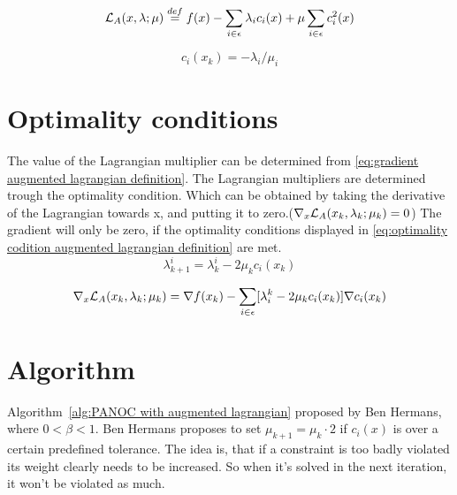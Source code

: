 	\begin{equation}
		\mathcal{L}_A(x,\lambda;\mu) \overset{def}{=} f(x) - \sum_{i \in \epsilon}\lambda_ic_i(x) + \mu \sum_{i \in \epsilon}c_i^2(x)
		\label{eq:augmented lagrangian definition}
	\end{equation}
			
	\begin{equation}
		c_i(x_k) = -\lambda_i/\mu_i
		\label{eq:perturbed feasibility conditions}
	\end{equation}
	

\section{Optimality conditions}
	The value of the Lagrangian multiplier can be determined from \eqref{eq:gradient augmented lagrangian definition}. The Lagrangian multipliers are determined trough the optimality condition. Which can be obtained by taking the derivative of the Lagrangian towards x, and putting it to zero.($\nabla_x \mathcal{L}_A(x_k,\lambda_k;\mu_k) = 0$) The gradient will only be zero, if the optimality conditions displayed in \eqref{eq:optimality codition augmented lagrangian definition} are met.
	\begin{equation}
		\lambda_{k+1}^{i} = \lambda_{k}^{i} - 2\mu_k c_i(x_k)
		\label{eq:optimality codition augmented lagrangian definition}
	\end{equation}

	\begin{equation}
		\nabla_x \mathcal{L}_A(x_k,\lambda_k;\mu_k) = \nabla f(x_k) - \sum_{i \in \epsilon} [\lambda_i^k - 2\mu_k c_i(x_k)] \nabla c_i(x_k)
		\label{eq:gradient augmented lagrangian definition}
	\end{equation}	
	
	
	
\section{Algorithm}
	Algorithm~\ref{alg:PANOC with augmented lagrangian} proposed by Ben Hermans, where $0<\beta<1$. Ben Hermans proposes to set $\mu_{k+1}=\mu_k \cdot 2$ if $c_i(x)$ is over a certain predefined tolerance. The idea is, that if a constraint is too badly violated its weight clearly needs to be increased. So when it's solved in the next iteration, it won't be violated as much.
	
